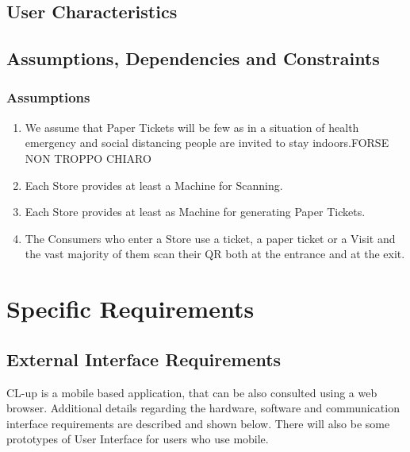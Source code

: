 \documentclass[a4paper, 10pt, oneside]{article}
\newcommand*{\lorenzo}[1]{\textcolor{BurntOrange}{#1}}
\begin{document}
\subsection{User Characteristics}

\subsection{Assumptions, Dependencies and Constraints}
\subsubsection{Assumptions}
\begin{enumerate}[label={DA.\arabic{*}}]
    \item \label{dom:fewPaperTickets} 
We assume that Paper Tickets will be few as in a situation of health emergency and social distancing people are invited to stay indoors.\lorenzo{FORSE NON TROPPO CHIARO}
    \item \label{dom:machineScanning}Each Store provides at least a Machine for Scanning.
    \item \label{dom:machinePaperTicket}Each Store provides at least as Machine for generating Paper Tickets.
    \item \label{dom:consumerAccessStore}The Consumers who enter a Store use a ticket, a paper ticket or a Visit and the vast majority of them scan their QR both at the entrance and at the exit.
\end{enumerate}
\section{Specific Requirements}
\label{specificRequirements}
\subsection{External Interface Requirements}
CL-up is a mobile based application, that can be also consulted using a web browser. Additional details regarding the hardware, software and communication interface requirements are described and shown below. There will also be some prototypes of User Interface for users who use mobile.
\end{document}
